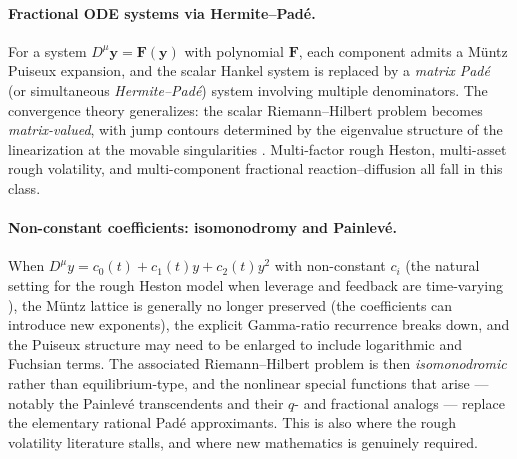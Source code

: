 \documentclass[11pt,a4paper]{article}
\begin{document}
\paragraph{Fractional ODE systems via Hermite--Pad\'e.}
For a system \(D^\mu \bm y = \bm F(\bm y)\) with polynomial \(\bm F\), each component admits a M\"untz Puiseux expansion, and the scalar Hankel system is replaced by a \emph{matrix Pad\'e} (or simultaneous \emph{Hermite--Pad\'e}) system involving multiple denominators.
The convergence theory generalizes: the scalar Riemann--Hilbert problem becomes \emph{matrix-valued}, with jump contours determined by the eigenvalue structure of the linearization at the movable singularities \cite{deift1999}.
Multi-factor rough Heston, multi-asset rough volatility, and multi-component fractional reaction--diffusion all fall in this class.

\paragraph{Non-constant coefficients: isomonodromy and Painlev\'e.}
When \(D^\mu y = c_0(t) + c_1(t) y + c_2(t) y^2\) with non-constant \(c_i\) (the natural setting for the rough Heston model when leverage and feedback are time-varying \cite{eleuch2019}), the M\"untz lattice is generally no longer preserved (the coefficients can introduce new exponents), the explicit Gamma-ratio recurrence breaks down, and the Puiseux structure may need to be enlarged to include logarithmic and Fuchsian terms.
The associated Riemann--Hilbert problem is then \emph{isomonodromic} rather than equilibrium-type, and the nonlinear special functions that arise --- notably the Painlev\'e transcendents and their \(q\)- and fractional analogs --- replace the elementary rational Pad\'e approximants.
This is also where the rough volatility literature stalls, and where new mathematics is genuinely required.
\end{document}
